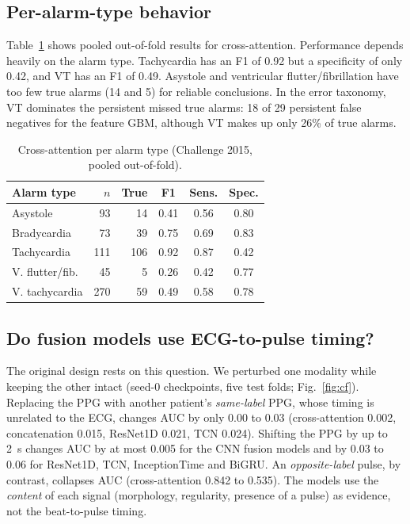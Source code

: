 \documentclass[conference]{IEEEtran}
\begin{document}
\subsection{Per-alarm-type behavior}
Table~\ref{tab:type} shows pooled out-of-fold results for cross-attention. Performance depends heavily on the alarm type. Tachycardia has an F1 of 0.92 but a specificity of only 0.42, and VT has an F1 of 0.49. Asystole and ventricular flutter/fibrillation have too few true alarms (14 and 5) for reliable conclusions. In the error taxonomy, VT dominates the persistent missed true alarms: 18 of 29 persistent false negatives for the feature GBM, although VT makes up only 26\% of true alarms.

\begin{table}[t]
\caption{Cross-attention per alarm type (Challenge 2015, pooled out-of-fold).}
\label{tab:type}
\centering
\small
\begin{tabular}{lrrccc}
\toprule
Alarm type & $n$ & True & F1 & Sens. & Spec.\\
\midrule
Asystole & 93 & 14 & 0.41 & 0.56 & 0.80\\
Bradycardia & 73 & 39 & 0.75 & 0.69 & 0.83\\
Tachycardia & 111 & 106 & 0.92 & 0.87 & 0.42\\
V. flutter/fib. & 45 & 5 & 0.26 & 0.42 & 0.77\\
V. tachycardia & 270 & 59 & 0.49 & 0.58 & 0.78\\
\bottomrule
\end{tabular}
\end{table}

\subsection{Do fusion models use ECG-to-pulse timing?}
The original design rests on this question. We perturbed one modality while keeping the other intact (seed-0 checkpoints, five test folds; Fig.~\ref{fig:cf}). Replacing the PPG with another patient's \emph{same-label} PPG, whose timing is unrelated to the ECG, changes AUC by only 0.00 to 0.03 (cross-attention 0.002, concatenation 0.015, ResNet1D 0.021, TCN 0.024). Shifting the PPG by up to 2~s changes AUC by at most 0.005 for the CNN fusion models and by 0.03 to 0.06 for ResNet1D, TCN, InceptionTime and BiGRU. An \emph{opposite-label} pulse, by contrast, collapses AUC (cross-attention 0.842 to 0.535). The models use the \emph{content} of each signal (morphology, regularity, presence of a pulse) as evidence, not the beat-to-pulse timing.
\end{document}
